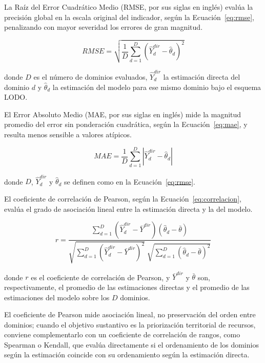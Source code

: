 La Raíz del Error Cuadrático Medio (RMSE, por sus siglas en inglés) evalúa la precisión global en la escala original del indicador, según la Ecuación~\ref{eq:rmse}, penalizando con mayor severidad los errores de gran magnitud.

\begin{equation}
    RMSE = \sqrt{\frac{1}{D} \sum_{d=1}^{D} \left(\hat{Y}_d^{dir} - \hat{\theta}_d\right)^2}
    \label{eq:rmse}
\end{equation}

\noindent donde $D$ es el número de dominios evaluados, $\hat{Y}_d^{dir}$ la estimación directa del dominio $d$ y $\hat{\theta}_d$ la estimación del modelo para ese mismo dominio bajo el esquema LODO.

El Error Absoluto Medio (MAE, por sus siglas en inglés) mide la magnitud promedio del error sin ponderación cuadrática, según la Ecuación~\ref{eq:mae}, y resulta menos sensible a valores atípicos.

\begin{equation}
    MAE = \frac{1}{D} \sum_{d=1}^{D} \left| \hat{Y}_d^{dir} - \hat{\theta}_d \right|
    \label{eq:mae}
\end{equation}

\noindent donde $D$, $\hat{Y}_d^{dir}$ y $\hat{\theta}_d$ se definen como en la Ecuación~\ref{eq:rmse}.

El coeficiente de correlación de Pearson, según la Ecuación~\ref{eq:correlacion}, evalúa el grado de asociación lineal entre la estimación directa y la del modelo.

\begin{equation}
    r = \frac{\sum_{d=1}^{D} \left(\hat{Y}_d^{dir} - \bar{Y}^{dir}\right)\left(\hat{\theta}_d - \bar{\theta}\right)}
    {\sqrt{\sum_{d=1}^{D} \left(\hat{Y}_d^{dir} - \bar{Y}^{dir}\right)^2} \; \sqrt{\sum_{d=1}^{D} \left(\hat{\theta}_d - \bar{\theta}\right)^2}}
    \label{eq:correlacion}
\end{equation}

\noindent donde $r$ es el coeficiente de correlación de Pearson, y $\bar{Y}^{dir}$ y $\bar{\theta}$ son, respectivamente, el promedio de las estimaciones directas y el promedio de las estimaciones del modelo sobre los $D$ dominios.

El coeficiente de Pearson mide asociación lineal, no preservación del orden entre dominios; cuando el objetivo sustantivo es la priorización territorial de recursos, conviene complementarlo con un coeficiente de correlación de rangos, como Spearman o Kendall, que evalúa directamente si el ordenamiento de los dominios según la estimación coincide con su ordenamiento según la estimación directa.

